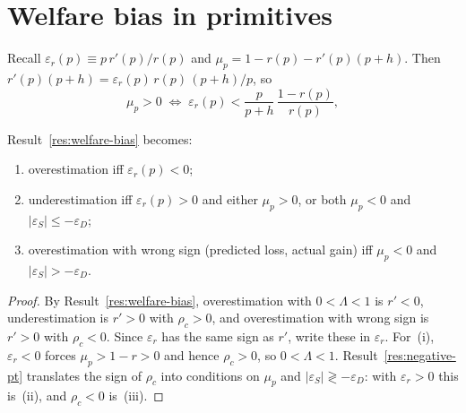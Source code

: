 \clearpage
\appendix
\section{Welfare bias in primitives}
\label{app:welfare-bias-primitives}
Recall $\varepsilon_r(p)\equiv p\,r'(p)/r(p)$ and
$\mu_p=1-r(p)-r'(p)(p+h)$.  Then
$r'(p)(p+h)=\varepsilon_r(p)\,r(p)\,(p+h)/p$, so
\begin{equation}
  \mu_p>0
  \;\iff\;
  \varepsilon_r(p)
  <
  \frac{p}{p+h}\,\frac{1-r(p)}{r(p)},
  \label{eq:app-mu-er}
\end{equation}

Result~\ref{res:welfare-bias} becomes:
\begin{enumerate}
\item[(i)] overestimation iff $\varepsilon_r(p)<0$;
\item[(ii)] underestimation iff $\varepsilon_r(p)>0$ and either $\mu_p>0$,
or both $\mu_p<0$ and $|\varepsilon_S|\le -\varepsilon_D$;
\item[(iii)] overestimation with wrong sign (predicted loss, actual gain)
iff $\mu_p<0$ and $|\varepsilon_S|>-\varepsilon_D$.
\end{enumerate}
\begin{proof}
By Result~\ref{res:welfare-bias}, overestimation with $0<\Lambda<1$ is
$r'<0$, underestimation is $r'>0$ with $\rho_c>0$, and overestimation with
wrong sign is $r'>0$ with $\rho_c<0$.
Since $\varepsilon_r$ has the same sign as $r'$, write these in
$\varepsilon_r$.  For~(i), $\varepsilon_r<0$ forces $\mu_p>1-r>0$ and hence
$\rho_c>0$, so $0<\Lambda<1$.
Result~\ref{res:negative-pt} translates the sign of $\rho_c$ into conditions
on $\mu_p$ and $|\varepsilon_S|\gtrless -\varepsilon_D$: with
$\varepsilon_r>0$ this is~(ii), and $\rho_c<0$ is~(iii).
\end{proof}
